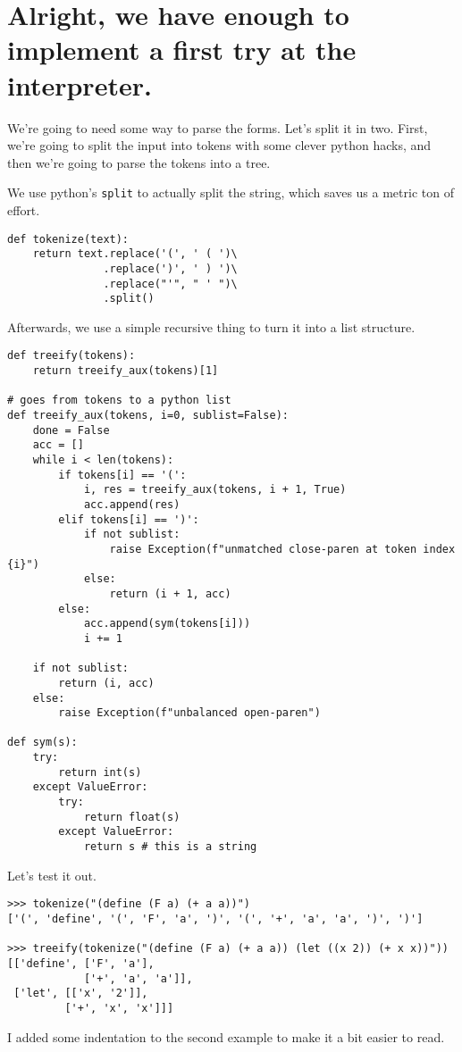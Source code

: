 \documentclass[11pt]{article}
\begin{document}
\section{Alright, we have enough to implement a first try at the interpreter.}
\label{sec:org66960dc}
We're going to need some way to parse the forms. Let's split it in
two. First, we're going to split the input into tokens with some
clever python hacks, and then we're going to parse the tokens into a
tree.

We use python's \texttt{split} to actually split the string, which saves us
a metric ton of effort.
\begin{verbatim}
def tokenize(text):
    return text.replace('(', ' ( ')\
               .replace(')', ' ) ')\
               .replace("'", " ' ")\
               .split()
\end{verbatim}

Afterwards, we use a simple recursive thing to turn it into a list
structure.
\begin{verbatim}
def treeify(tokens):
    return treeify_aux(tokens)[1]

# goes from tokens to a python list 
def treeify_aux(tokens, i=0, sublist=False):
    done = False
    acc = []
    while i < len(tokens):
        if tokens[i] == '(':
            i, res = treeify_aux(tokens, i + 1, True)
            acc.append(res)
        elif tokens[i] == ')':
            if not sublist:
                raise Exception(f"unmatched close-paren at token index {i}")
            else:
                return (i + 1, acc)
        else:
            acc.append(sym(tokens[i]))
            i += 1

    if not sublist:
        return (i, acc)
    else:
        raise Exception(f"unbalanced open-paren")

def sym(s):
    try:
        return int(s)
    except ValueError:
        try:
            return float(s)
        except ValueError:
            return s # this is a string
\end{verbatim}

Let's test it out.
\begin{verbatim}
>>> tokenize("(define (F a) (+ a a))")
['(', 'define', '(', 'F', 'a', ')', '(', '+', 'a', 'a', ')', ')']

>>> treeify(tokenize("(define (F a) (+ a a)) (let ((x 2)) (+ x x))"))
[['define', ['F', 'a'], 
            ['+', 'a', 'a']], 
 ['let', [['x', '2']], 
         ['+', 'x', 'x']]]
\end{verbatim}
I added some indentation to the second example to make it a bit
easier to read.
\end{document}
